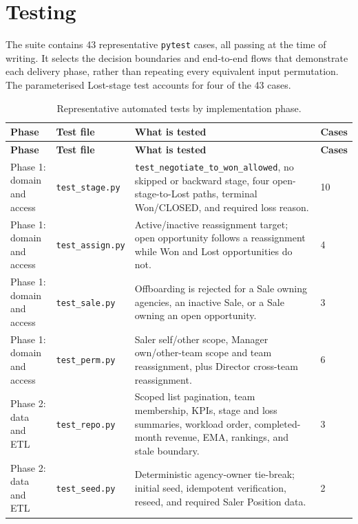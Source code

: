 \documentclass[13pt, a4paper]{article}
\begin{document}
\section{Testing}

The suite contains 43 representative \texttt{pytest} cases, all passing at the time of
writing. It selects the decision boundaries and end-to-end flows that demonstrate each
delivery phase, rather than repeating every equivalent input permutation. The parameterised
Lost-stage test accounts for four of the 43 cases.

\small
\begin{longtable}{@{}p{}p{}p{}p{}@{}}
\caption{Representative automated tests by implementation phase.}\label{tab:test-phases}\\
\hline
\textbf{Phase} & \textbf{Test file} & \textbf{What is tested} & \textbf{Cases} \\
\hline
\endfirsthead
\hline
\textbf{Phase} & \textbf{Test file} & \textbf{What is tested} & \textbf{Cases} \\
\hline
\endhead
Phase 1: domain and access & \texttt{test\_stage.py} & \texttt{test\_negotiate\_to\_won\_allowed}, no skipped or backward stage, four open-stage-to-Lost paths, terminal Won/CLOSED, and required loss reason. & 10 \\
\hline
Phase 1: domain and access & \texttt{test\_assign.py} & Active/inactive reassignment target; open opportunity follows a reassignment while Won and Lost opportunities do not. & 4 \\
\hline
Phase 1: domain and access & \texttt{test\_sale.py} & Offboarding is rejected for a Sale owning agencies, an inactive Sale, or a Sale owning an open opportunity. & 3 \\
\hline
Phase 1: domain and access & \texttt{test\_perm.py} & Saler self/other scope, Manager own/other-team scope and team reassignment, plus Director cross-team reassignment. & 6 \\
\hline
Phase 2: data and ETL & \texttt{test\_repo.py} & Scoped list pagination, team membership, KPIs, stage and loss summaries, workload order, completed-month revenue, EMA, rankings, and stale boundary. & 3 \\
\hline
Phase 2: data and ETL & \texttt{test\_seed.py} & Deterministic agency-owner tie-break; initial seed, idempotent verification, reseed, and required Saler Position data. & 2 \\

\end{longtable}
\end{document}
